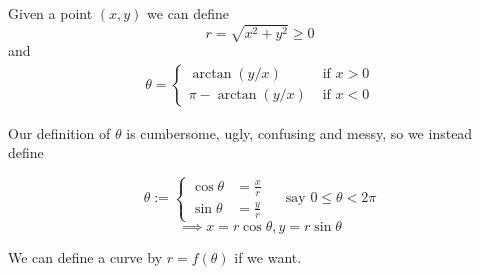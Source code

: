 \documentclass[10pt]{scrartcl}
\begin{document}
\vspace*{5pt}

\begin{definition}  Given a point $(x,y)$ we can define 
\[r = \sqrt{x^2 + y^2} \geq 0\]
and 
\[
\begin{aligned}
  \theta = \begin{cases}\arctan(y/x) &\text{ if } x > 0\\
  \pi - \arctan(y/x) &\text{ if } x < 0
  \end{cases}
\end{aligned}
\]
\end{definition}


  \begin{center}
  \end{center}
  
Our definition of $\theta$ is cumbersome, ugly, confusing and messy, so we instead define

\[\theta := \begin{cases}
 \cos\theta &= \frac{x}{r}\\
 \sin\theta &= \frac{y}{r}	
 \end{cases} \quad \text{ say } 0 \leq \theta < 2\pi
\]
\[\boxed{\implies x = r\cos\theta, y = r\sin\theta}\]

We can define a curve by $r = f(\theta)$ if we want.\\ 
\end{document}
